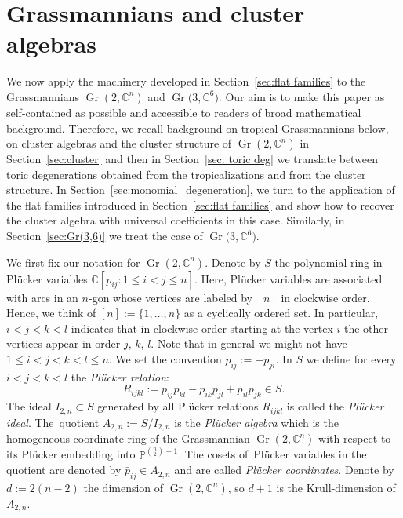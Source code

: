 \documentclass[10pt,a4paper]{amsart}
\numberwithin{equation}{section}
\DeclareMathOperator{\Gr}{Gr}
\begin{document}
\section{Grassmannians and cluster algebras}\label{sec:Gr}

We now apply the machinery developed in Section~\ref{sec:flat families} to the Grassmannians $\Gr(2,\mathbb C^n)$ and $\Gr\big(3,\mathbb C^6\big)$.
Our aim is to make this paper as self-contained as possible and accessible to readers of broad mathematical background.
Therefore, we recall background on tropical Grassmannians below, on cluster algebras and the cluster structure of $\Gr(2,\mathbb C^n)$ in Section~\ref{sec:cluster} and then in Section~\ref{sec: toric deg} we translate between toric degenerations obtained from the tropicalizations and from the cluster structure.
In Section~\ref{sec:monomial_degeneration}, we turn to the application of the flat families introduced in Section~\ref{sec:flat families} and show how to recover the cluster algebra with universal coefficients in this case.
Similarly, in Section~\ref{sec:Gr(3,6)} we treat the case of $\Gr\big(3,\mathbb C^6\big)$.



We first fix our notation for $\Gr(2,\mathbb C^n)$.
Denote by $S$ the polynomial ring in Pl\"ucker variables $\mathbb C[p_{ij}\colon 1\leq i<j\le n]$.
Here, Pl\"ucker variables are associated with arcs in an $n$-gon whose vertices are labeled by $[n]$ in clockwise order.
Hence, we think of $[n]:=\{1,\ldots,n\}$ as a cyclically ordered set. In particular, $i<j<k<l$ indicates that in clockwise order starting at the vertex $i$ the other vertices appear in order $j$, $k$, $l$.
Note that in general we might not have $1\le i<j<k<l\le n$.
We set the convention $p_{ij}:=-p_{ji}$.
In $S$ we define for every $i<j<k<l$ the {\it Pl\"ucker relation}:
\begin{displaymath}
R_{ijkl}:=p_{ij}p_{kl}-p_{ik}p_{jl}+p_{il}p_{jk}\in S.
\end{displaymath}
The ideal $I_{2,n}\subset S$ generated by all Pl\"ucker relations $R_{ijkl}$ is called the {\it Pl\"ucker ideal}. The~quo\-tient $A_{2,n}:=S/I_{2,n}$ is the {\it Pl\"ucker algebra} which is the homogeneous coordinate ring of the Grassmannian $\Gr(2,\mathbb C^n)$ with respect to its Pl\"ucker embedding into $\mathbb P^{\binom{n}{2}-1}$.
The cosets of~Pl\"u\-cker variables in the quotient are denoted by $\bar p_{ij}\in A_{2,n}$ and are called {\it Pl\"ucker coordinates}.
Denote by $d:=2(n-2)$ the dimension of $\Gr(2,\mathbb C^n)$, so $d+1$ is the Krull-dimension of $A_{2,n}$.
\end{document}
